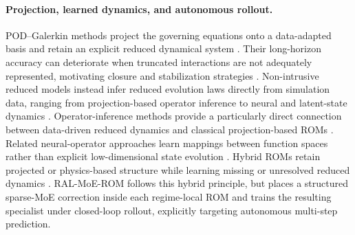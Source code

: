 \documentclass{article}
\begin{document}
\paragraph{Projection, learned dynamics, and autonomous rollout.}
POD--Galerkin methods project the governing equations onto a data-adapted basis and retain an explicit reduced dynamical system \citep{sirovich1987,berkooz1993,benner2015}. Their long-horizon accuracy can deteriorate when truncated interactions are not adequately represented, motivating closure and stabilization strategies
\citep{amsallem2012}. Non-intrusive reduced models instead infer reduced evolution laws directly from simulation data, ranging from projection-based operator inference to neural and latent-state dynamics
\citep{peherstorfer2016,hesthaven2018,champion2019,lee2020, pan2024domain,park2024}. Operator-inference methods provide a particularly direct connection between data-driven reduced dynamics and classical projection-based ROMs \citep{kramer2024}. Related neural-operator approaches learn mappings between function spaces
rather than explicit low-dimensional state evolution \citep{lu2021,kovachki2023}. Hybrid ROMs retain projected or physics-based structure while learning missing or unresolved reduced dynamics \citep{duraisamy2019,brunton2020,fresca2022,dar2023,geelen2023,manti2025}. RAL-MoE-ROM follows this hybrid principle, but places a structured sparse-MoE correction inside each regime-local ROM and trains the resulting specialist under closed-loop rollout, explicitly targeting autonomous multi-step prediction.
\end{document}
